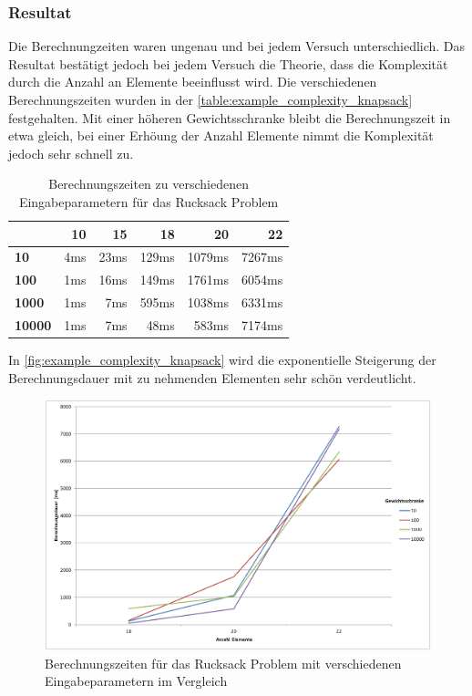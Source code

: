 \subsubsection{Resultat}
Die Berechnungzeiten waren ungenau und bei jedem Versuch unterschiedlich. Das Resultat bestätigt jedoch bei jedem Versuch die Theorie, dass die Komplexität durch die Anzahl an Elemente 
beeinflusst wird. Die verschiedenen Berechnungszeiten wurden in der \autoref{table:example_complexity_knapsack} festgehalten. Mit einer höheren Gewichtsschranke bleibt die 
Berechnungszeit in etwa gleich, bei einer Erhöung der Anzahl Elemente nimmt die Komplexität jedoch sehr schnell zu.

\begin{table}[ht]
\centering
  \begin{tabular}{ l | r | r | r | r | r }
	\hline
	\rowcolor{gray}
	\backslashbox{Gewichtsschranke:}{Anzahl an Elemente:}	& \textbf{10}	& \textbf{15} 	& \textbf{18}	& \textbf{20}	& \textbf{22}\\ \hline
	\textbf{10}							& 4ms			& 23ms		& 129ms		& 1079ms		& 7267ms 	\\ \hline
	\textbf{100}							& 1ms			& 16ms		& 149ms		& 1761ms		& 6054ms	\\ \hline
	\textbf{1000}						& 1ms			& 7ms			& 595ms		& 1038ms		& 6331ms	\\ \hline
	\textbf{10000}						& 1ms			& 7ms			& 48ms		& 583ms		& 7174ms	\\ \hline
  \end{tabular}
   \caption[Berechnungszeiten zu verschiedenen Eingabeparametern für das Rucksack Problem]{Berechnungszeiten zu verschiedenen Eingabeparametern für das Rucksack Problem}
   \label{table:example_complexity_knapsack}
\end{table}

In \autoref{fig:example_complexity_knapsack} wird die exponentielle Steigerung der Berechnungsdauer mit zu nehmenden Elementen sehr schön verdeutlicht.

\begin{figure}[h]
\centering
\includegraphics[scale=0.45]{images/excel/knapsack_complexity_example.png}
\caption[Berechnungszeiten für das Rucksack Problem mit verschiedenen Eingabeparametern im Vergleich]{Berechnungszeiten für das Rucksack Problem mit verschiedenen Eingabeparametern 
im Vergleich \selfmade{}}
\label{fig:example_complexity_knapsack}
\end{figure}
